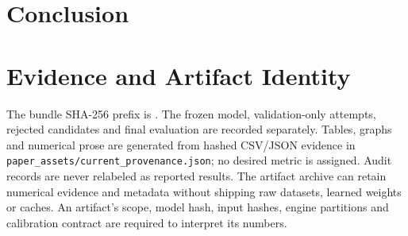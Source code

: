 \documentclass[conference]{IEEEtran}
\begin{document}
\section{\textbf{Conclusion}}


\appendices
\section{\textbf{Evidence and Artifact Identity}}
The bundle SHA-256 prefix is \texttt{\CurrentBundleHash}. The frozen
model, validation-only attempts, rejected candidates and final evaluation
are recorded separately. Tables, graphs and numerical prose are generated from
hashed CSV/JSON evidence in \texttt{paper\_assets/current\_provenance.json};
no desired metric is assigned. Audit records are never relabeled as reported
results. The artifact archive can retain numerical evidence and metadata without
shipping raw datasets, learned weights or caches. An artifact's scope, model hash,
input hashes, engine partitions and calibration contract are required to
interpret its numbers.
\end{document}
